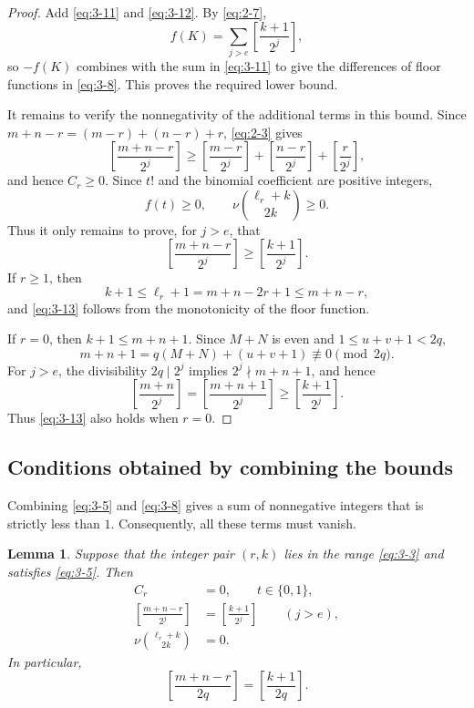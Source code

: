 \documentclass[11pt,a4paper]{article}
\numberwithin{equation}{section}
\newtheorem{lemma}[theorem]{Lemma}
\theoremstyle{definition}
\begin{document}
\begin{proof}
Add \eqref{eq:3-11} and \eqref{eq:3-12}. By \eqref{eq:2-7},
\[
f(K)=\sum_{j>e}\left[\frac{k+1}{2^j}\right],
\]
so $-f(K)$ combines with the sum in \eqref{eq:3-11} to give the differences of floor functions in \eqref{eq:3-8}. This proves the required lower bound.

It remains to verify the nonnegativity of the additional terms in this bound. Since $m+n-r=(m-r)+(n-r)+r$, \eqref{eq:2-3} gives
\[
\left[\frac{m+n-r}{2^j}\right]
\ge\left[\frac{m-r}{2^j}\right]+\left[\frac{n-r}{2^j}\right]+\left[\frac r{2^j}\right],
\]
and hence $C_r\ge0$. Since $t!$ and the binomial coefficient are positive integers,
\[
f(t)\ge0,\qquad\nu\binom{\ell_r+k}{2k}\ge0.
\]
Thus it only remains to prove, for $j>e$, that
\begin{equation}
\left[\frac{m+n-r}{2^j}\right]\ge\left[\frac{k+1}{2^j}\right].
\label{eq:3-13}
\end{equation}
If $r\ge1$, then
\[
k+1\le\ell_r+1=m+n-2r+1\le m+n-r,
\]
and \eqref{eq:3-13} follows from the monotonicity of the floor function.

If $r=0$, then $k+1\le m+n+1$. Since $M+N$ is even and $1\le u+v+1<2q$,
\[
m+n+1=q(M+N)+(u+v+1)\not\equiv0\pmod{2q}.
\]
For $j>e$, the divisibility $2q\mid2^j$ implies $2^j\nmid m+n+1$, and hence
\[
\left[\frac{m+n}{2^j}\right]
=\left[\frac{m+n+1}{2^j}\right]
\ge\left[\frac{k+1}{2^j}\right].
\]
Thus \eqref{eq:3-13} also holds when $r=0$.
\end{proof}

\subsection{Conditions obtained by combining the bounds}

Combining \eqref{eq:3-5} and \eqref{eq:3-8} gives a sum of nonnegative integers that is strictly less than $1$. Consequently, all these terms must vanish.

\begin{lemma}\label{lem:3-4}
Suppose that the integer pair $(r,k)$ lies in the range \eqref{eq:3-3} and satisfies \eqref{eq:3-5}. Then
\begin{align}
C_r&=0,\qquad t\in\{0,1\},
\label{eq:3-14}\\
\left[\frac{m+n-r}{2^j}\right]&=\left[\frac{k+1}{2^j}\right]\qquad(j>e),
\label{eq:3-15}\\
\nu\binom{\ell_r+k}{2k}&=0.
\label{eq:3-16}
\end{align}
In particular,
\begin{equation}
\left[\frac{m+n-r}{2q}\right]=\left[\frac{k+1}{2q}\right].
\label{eq:3-17}
\end{equation}
\end{lemma}
\end{document}
